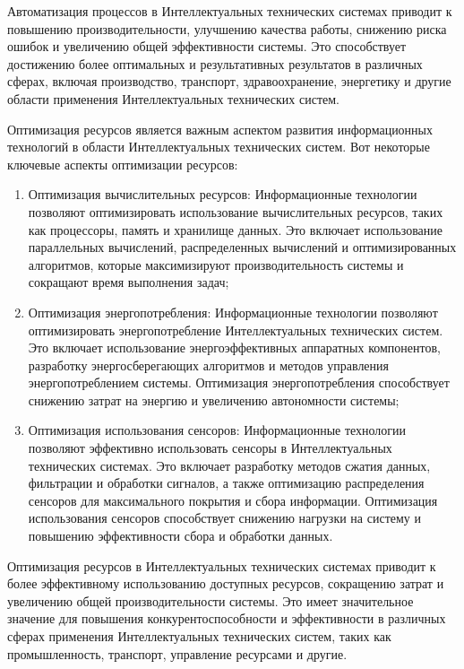     Автоматизация процессов в Интеллектуальных технических системах приводит к повышению производительности, улучшению качества работы, снижению риска ошибок и увеличению общей эффективности системы. Это способствует достижению более оптимальных и результативных результатов в различных сферах, включая производство, транспорт, здравоохранение, энергетику и другие области применения Интеллектуальных технических систем.

    Оптимизация ресурсов является важным аспектом развития информационных технологий в области Интеллектуальных технических систем. Вот некоторые ключевые аспекты оптимизации ресурсов:
    \begin{enumerate}
        \item Оптимизация вычислительных ресурсов: Информационные технологии позволяют оптимизировать использование вычислительных ресурсов, таких как процессоры, память и хранилище данных. Это включает использование параллельных вычислений, распределенных вычислений и оптимизированных алгоритмов, которые максимизируют производительность системы и сокращают время выполнения задач;
        \item Оптимизация энергопотребления: Информационные технологии позволяют оптимизировать энергопотребление Интеллектуальных технических систем. Это включает использование энергоэффективных аппаратных компонентов, разработку энергосберегающих алгоритмов и методов управления энергопотреблением системы. Оптимизация энергопотребления способствует снижению затрат на энергию и увеличению автономности системы;
        \item Оптимизация использования сенсоров: Информационные технологии позволяют эффективно использовать сенсоры в Интеллектуальных технических системах. Это включает разработку методов сжатия данных, фильтрации и обработки сигналов, а также оптимизацию распределения сенсоров для максимального покрытия и сбора информации. Оптимизация использования сенсоров способствует снижению нагрузки на систему и повышению эффективности сбора и обработки данных.
    \end{enumerate}

    Оптимизация ресурсов в Интеллектуальных технических системах приводит к более эффективному использованию доступных ресурсов, сокращению затрат и увеличению общей производительности системы. Это имеет значительное значение для повышения конкурентоспособности и эффективности в различных сферах применения Интеллектуальных технических систем, таких как промышленность, транспорт, управление ресурсами и другие.

